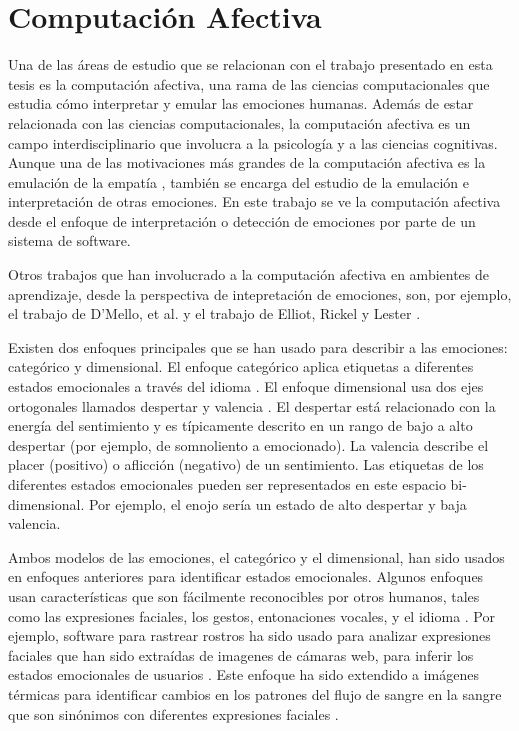 
\chapter{Computación Afectiva}

Una de las áreas de estudio que se relacionan con el trabajo presentado en esta tesis es la computación afectiva, una rama de las ciencias computacionales que estudia cómo interpretar y emular las emociones humanas. Además de estar relacionada con las ciencias computacionales, la computación afectiva es un campo interdisciplinario que involucra a la psicología y a las ciencias cognitivas. Aunque una de las motivaciones más grandes de la computación afectiva es la emulación de la empatía \cite{diamond2003love} \cite{picard2000affective}, también se encarga del estudio de la emulación e interpretación de otras emociones. En este trabajo se ve la computación afectiva desde el enfoque de interpretación o detección de emociones por parte de un sistema de software.

Otros trabajos que han involucrado a la computación afectiva en ambientes de aprendizaje, desde la perspectiva de intepretación de emociones, son, por ejemplo, el trabajo de D'Mello, et al. \cite{sidney2005integrating} y el trabajo de Elliot, Rickel y Lester \cite{elliott1999lifelike}.

Existen dos enfoques principales que se han usado para describir a las emociones: categórico y dimensional. El enfoque categórico aplica etiquetas a diferentes estados emocionales a través del idioma \cite{ekman1992argument}. El enfoque dimensional usa dos ejes ortogonales llamados despertar y valencia \cite{russell2003core}. El despertar está relacionado con la energía del sentimiento y es típicamente descrito en un rango de bajo a alto despertar (por ejemplo, de somnoliento a emocionado). La valencia describe el placer (positivo) o aflicción (negativo) de un sentimiento. Las etiquetas de los diferentes estados emocionales pueden ser representados en este espacio bi-dimensional. Por ejemplo, el enojo sería un estado de alto despertar y baja valencia.

Ambos modelos de las emociones, el categórico y el dimensional, han sido usados en enfoques anteriores para identificar estados emocionales. Algunos enfoques usan características que son fácilmente reconocibles por otros humanos, tales como las expresiones faciales, los gestos, entonaciones vocales, y el idioma \cite{picard2000affective}. Por ejemplo, software para rastrear rostros ha sido usado para analizar expresiones faciales que han sido extraídas de imagenes de cámaras web, para inferir los estados emocionales de usuarios \cite{de2003real}. Este enfoque ha sido extendido a imágenes térmicas para identificar cambios en los patrones del flujo de sangre en la sangre que son sinónimos con diferentes expresiones faciales \cite{khan2006automated}.

